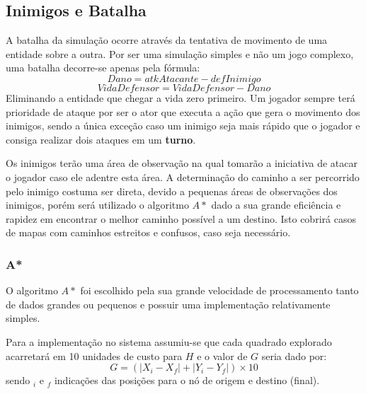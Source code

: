 \subsection{Inimigos e Batalha}

A batalha da simulação ocorre através da tentativa de movimento de uma entidade sobre a outra.
Por ser uma simulação simples e não um jogo complexo, uma batalha decorre-se apenas pela fórmula: 
\begin{equation}
	Dano = atkAtacante - defInimigo
\end{equation}
\begin{equation}
	VidaDefensor = VidaDefensor - Dano
\end{equation}
Eliminando a entidade que chegar a vida zero primeiro. Um jogador sempre terá prioridade de ataque por ser o ator que executa a ação que gera o movimento dos inimigos, sendo a única exceção caso um inimigo seja mais rápido que o jogador e consiga realizar dois ataques em um \textbf{turno}.

Os inimigos terão uma área de observação na qual tomarão a iniciativa de atacar o jogador caso ele adentre esta área. 
A determinação do caminho a ser percorrido pelo inimigo costuma ser direta, devido a pequenas áreas de observações dos inimigos, porém será utilizado o algoritmo $A*$ dado a sua grande eficiência e rapidez em encontrar o melhor caminho possível a um destino. Isto cobrirá casos de mapas com caminhos estreitos e confusos, caso seja necessário. 

\subsubsection{A*}
O algoritmo $A*$ foi escolhido pela sua grande velocidade de processamento tanto de dados grandes ou pequenos e possuir uma implementação relativamente simples. 

Para a implementação no sistema assumiu-se que cada quadrado explorado acarretará em 10 unidades de custo para $H$ e o valor de $G$ seria dado por:
\begin{equation}
	G = (|X_i-X_f| + |Y_i-Y_f|) \times 10
\end{equation}
sendo $_i$ e $_f$ indicações das posições para o nó de origem e destino (final). 


